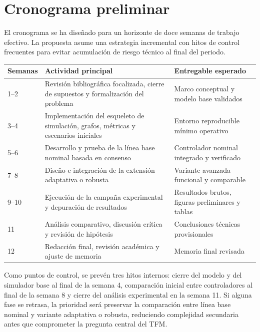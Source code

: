 \section{Cronograma preliminar}

El cronograma se ha diseñado para un horizonte de doce semanas de trabajo efectivo. La propuesta asume una estrategia incremental con hitos de control frecuentes para evitar acumulación de riesgo técnico al final del periodo.

\begin{center}
\small
\begin{tabular}{p{2.2cm}p{7.0cm}p{4.0cm}}
\toprule
\textbf{Semanas} & \textbf{Actividad principal} & \textbf{Entregable esperado} \\
\midrule
1--2 & Revisión bibliográfica focalizada, cierre de supuestos y formalización del problema & Marco conceptual y modelo base validados \\
3--4 & Implementación del esqueleto de simulación, grafos, métricas y escenarios iniciales & Entorno reproducible mínimo operativo \\
5--6 & Desarrollo y prueba de la línea base nominal basada en consenso & Controlador nominal integrado y verificado \\
7--8 & Diseño e integración de la extensión adaptativa o robusta & Variante avanzada funcional y comparable \\
9--10 & Ejecución de la campaña experimental y depuración de resultados & Resultados brutos, figuras preliminares y tablas \\
11 & Análisis comparativo, discusión crítica y revisión de hipótesis & Conclusiones técnicas provisionales \\
12 & Redacción final, revisión académica y ajuste de memoria & Memoria final revisada \\
\bottomrule
\end{tabular}
\end{center}

Como puntos de control, se prevén tres hitos internos: cierre del modelo y del simulador base al final de la semana 4, comparación inicial entre controladores al final de la semana 8 y cierre del análisis experimental en la semana 11. Si alguna fase se retrasa, la prioridad será preservar la comparación entre línea base nominal y variante adaptativa o robusta, reduciendo complejidad secundaria antes que comprometer la pregunta central del TFM.
